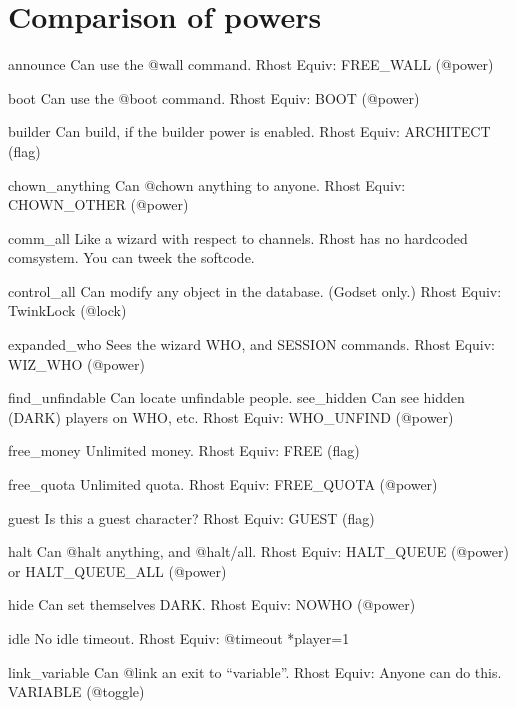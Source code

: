 \documentclass[letterpaper,10pt,english]{sphinxmanual}
\begin{document}
\chapter{Comparison of powers}
\label{\detokenize{powers:comparison-of-powers}}\label{\detokenize{powers::doc}}
\sphinxAtStartPar
announce              Can use the @wall command.
Rhost Equiv: \sphinxhyphen{} FREE\_WALL (@power)

\sphinxAtStartPar
boot                  Can use the @boot command.
Rhost Equiv: BOOT (@power)

\sphinxAtStartPar
builder               Can build, if the builder power is enabled.
Rhost Equiv: ARCHITECT (flag)

\sphinxAtStartPar
chown\_anything        Can @chown anything to anyone.
Rhost Equiv: CHOWN\_OTHER (@power)

\sphinxAtStartPar
comm\_all              Like a wizard with respect to channels.
Rhost has no hardcoded comsystem.  You can tweek the softcode.

\sphinxAtStartPar
control\_all           Can modify any object in the database. (God\sphinxhyphen{}set only.)
Rhost Equiv: TwinkLock (@lock)

\sphinxAtStartPar
expanded\_who          Sees the wizard WHO, and SESSION commands.
Rhost Equiv: WIZ\_WHO (@power)

\sphinxAtStartPar
find\_unfindable       Can locate unfindable people.
see\_hidden            Can see hidden (DARK) players on WHO, etc.
Rhost Equiv: WHO\_UNFIND (@power)

\sphinxAtStartPar
free\_money            Unlimited money.
Rhost Equiv: FREE (flag)

\sphinxAtStartPar
free\_quota            Unlimited quota.
Rhost Equiv: FREE\_QUOTA (@power)

\sphinxAtStartPar
guest                 Is this a guest character?
Rhost Equiv: GUEST (flag)

\sphinxAtStartPar
halt                  Can @halt anything, and @halt/all.
Rhost Equiv: HALT\_QUEUE (@power) or HALT\_QUEUE\_ALL (@power)

\sphinxAtStartPar
hide                  Can set themselves DARK.
Rhost Equiv: NOWHO (@power)

\sphinxAtStartPar
idle                  No idle timeout.
Rhost Equiv: @timeout *player=\sphinxhyphen{}1

\sphinxAtStartPar
link\_variable         Can @link an exit to “variable”.
Rhost Equiv: Anyone can do this.  VARIABLE (@toggle)
\end{document}
